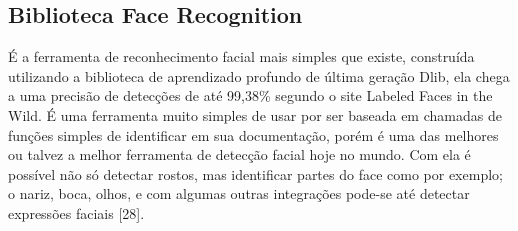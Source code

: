 \subsection{Biblioteca Face Recognition}
É a ferramenta de reconhecimento facial mais simples que existe, construída utilizando a biblioteca de aprendizado profundo de última geração Dlib, ela chega a uma precisão de detecções de até 99,38\% segundo o site Labeled Faces in the Wild. É uma ferramenta muito simples de usar por ser baseada em chamadas de funções simples de identificar em sua documentação, porém é uma das melhores ou talvez a melhor ferramenta de detecção facial hoje no mundo.
Com ela é possível não só detectar rostos, mas identificar partes do face como por exemplo; o nariz, boca, olhos, e com algumas outras integrações pode-se até detectar expressões faciais [28].

